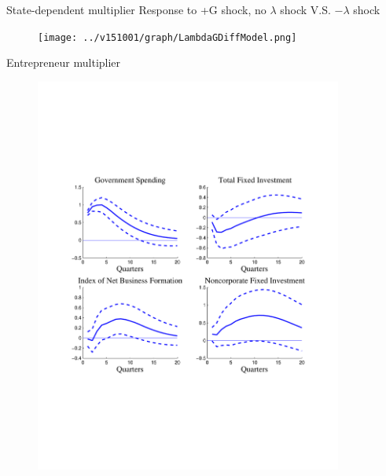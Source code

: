 \documentclass[svgnames]{beamer}
\begin{document}
\begin{frame}{State-dependent multiplier}
{Response to +G shock, no $\lambda$ shock V.S. $-\lambda$ shock}
\begin{figure}[!ht]
\texttt{[image: ../v151001/graph/LambdaGDiffModel.png]}
\end{figure}
\end{frame}

\begin{frame}{Entrepreneur multiplier}
\begin{figure}[!ht]
\includegraphics[trim=1cm 6.5cm 1cm 6.5cm, clip=true, width=0.9\textwidth]{graph/entre.pdf}
\end{figure}
\end{frame}
\end{document}
